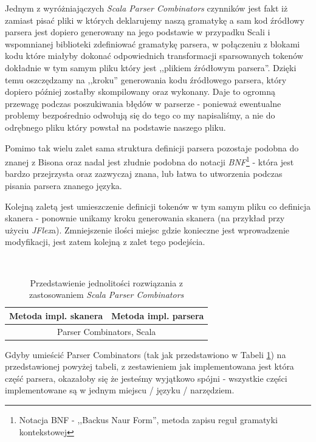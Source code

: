 \documentclass[pdflatex,11pt]{aghdpl}
\begin{document}
Jednym z wyróżniajączych \textit{Scala Parser Combinators} czynników jest fakt iż zamiast pisać pliki w których deklarujemy naszą gramatykę a 
sam kod źródłowy parsera jest dopiero generowany na jego podstawie w przypadku Scali i wspomnianej biblioteki zdefiniować gramatykę parsera, 
w połączeniu z blokami kodu które miałyby dokonać odpowiednich transformacji sparsowanych tokenów dokładnie w tym samym pliku który jest ,,plikiem źródłowym parsera''.
Dzięki temu oszczędzamy na ,,kroku'' generowania kodu źródłowego parsera, który dopiero później zostałby skompilowany oraz wykonany. 
Daje to ogromną przewagę podczas poszukiwania błędów w parserze - ponieważ ewentualne problemy bezpośrednio odwołują się do tego co my napisaliśmy,
a nie do odrębnego pliku który powstał na podstawie naszego pliku.

Pomimo tak wielu zalet sama struktura definicji parsera pozostaje podobna do znanej z Bisona oraz nadal jest złudnie 
podobna do notacji \textit{BNF}\footnote{Notacja BNF - ,,Backus Naur Form'', metoda zapisu reguł gramatyki kontekstowej} 
- która jest bardzo przejrzysta oraz zazwyczaj znana, lub łatwa to utworzenia podczas pisania parsera znanego języka.

Kolejną zaletą jest umieszczenie definicji tokenów w tym samym pliku co definicja skanera - ponownie unikamy kroku generowania 
skanera (na przykład przy użyciu \textit{JFlex}a). Zmniejszenie ilości miejsc gdzie konieczne jest wprowadzenie modyfikacji, jest zatem kolejną z zalet
tego podejścia.

~\\\*

\begin{table}[ch]
  \begin{center}
    \begin{tabular}{| l | l |}
      \hline
      Metoda impl. skanera & Metoda impl. parsera\\
      \hline
      \multicolumn{2}{|c|}{Parser Combinators, Scala} \\
      \hline
    \end{tabular}
    \caption{Przedstawienie jednolitości rozwiązania z zastosowaniem \textit{Scala Parser Combinators}}
  \end{center}
  \label{tab:scala_parsers_table}
\end{table}

Gdyby umieścić Parser Combinators (tak jak przedstawiono w Tabeli \ref{tab:scala_parsers_table}) na przedstawionej powyżej tabeli, z zestawieniem jak implementowana jest która część parsera,
okazałoby się że jesteśmy wyjątkowo spójni - wszystkie części implementowane są w jednym miejscu / języku / narzędziem.
\end{document}
